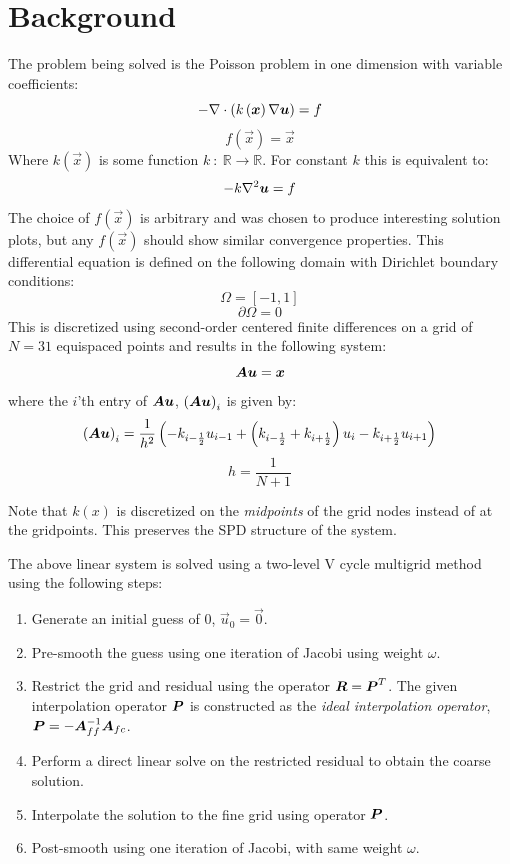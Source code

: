 


\section{Background}
The problem being solved is the Poisson problem in one dimension with variable coefficients:
$$ -\nabla \cdot \left(k\left(\bm{{x}}\right)\nabla\bm{{u}}\right) = f $$
$$ f(\vec{x}) = \vec{x} $$
Where $k\left(\vec{x}\right)$ is some function $k\: : \: \mathbb{R} \to \mathbb{R}$.  For constant $k$ this is equivalent to:
$$ -k\nabla^2\bm{{u}} = f $$
The choice of $f\left(\vec{x}\right)$ is arbitrary and was chosen to produce interesting solution plots, but any $f\left(\vec{x}\right)$ should show similar convergence properties.  This differential equation is defined on the following domain with Dirichlet boundary conditions:
$$ \Omega = \left[-1, 1\right]$$
$$ \partial\Omega = 0 $$
This is discretized using second-order centered finite differences on a grid of $N=31$ equispaced points and results in the following system:
$$ \bm{{A}}\bm{{u}} = \bm{{x}} $$
where the $i$'th entry of $\bm{{Au}}$, $\left(\bm{{Au}}\right)_i$ is given by:
$$\left(\bm{{Au}}\right)_i = \frac{1}{h^2} \left( -k_{i-\frac{1}{2}} u_{i-1} + \left(k_{i-\frac{1}{2}} + k_{i+\frac{1}{2}}\right)u_i - k_{i+\frac{1}{2}}u_{i+1} \right)$$
$$h = \frac{1}{N+1}$$

Note that $k\left(x\right)$ is discretized on the \textit{midpoints} of the grid nodes instead of at the gridpoints.  This preserves the SPD structure of the system.

The above linear system is solved using a two-level V cycle multigrid method using the following steps:

\begin{enumerate}
\item Generate an initial guess of $0$, $\vec{u}_0 = \vec{0}$.
\item Pre-smooth the guess using one iteration of Jacobi using weight $\omega$.
\item Restrict the grid and residual using the operator $\bm{{R}}=\bm{{P}}^T$.  The given interpolation operator $\bm{{P}}$ is constructed as the \textit{ideal interpolation operator}, $\bm{{P}}=-\bm{{A}}_{ff}^{-1}\bm{{A}}_{fc}$.
\item Perform a direct linear solve on the restricted residual to obtain the coarse solution.
\item Interpolate the solution to the fine grid using operator $\bm{{P}}$.
\item Post-smooth using one iteration of Jacobi, with same weight $\omega$.
\end{enumerate}

